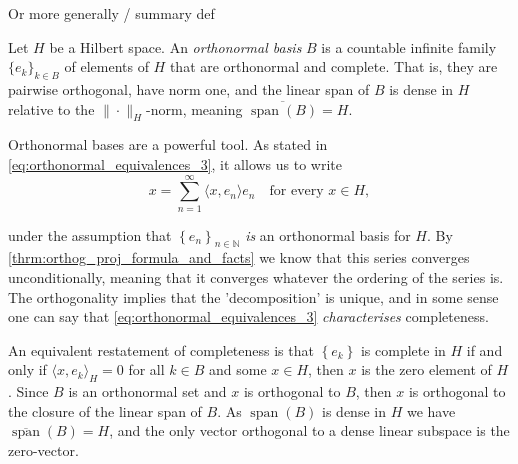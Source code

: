 \documentclass[../thesis.tex]{subfiles}
\begin{document}
Or more generally  / summary def

\begin{definition}
    Let $H$ be a Hilbert space. An \emph{orthonormal basis} $B$ is a countable infinite family $\{e_k\}_{k\in B}$ of elements of $H$ that are orthonormal and complete. That is, they are pairwise orthogonal, have norm one, and the linear span of $B$ is dense in $H$ relative to the $\|\cdot\|_H$-norm, meaning $\overline{\operatorname{span}(B)} = H$. 
\end{definition}


Orthonormal bases are a powerful tool. As stated in \cref{eq:orthonormal_equivalences_3}, it allows us to write
\begin{equation*}
    x= \sum_{n=1}^{\infty} \langle x, e_n \rangle e_n \quad \text{for every } x\in H,
\end{equation*}

under the assumption that $\left\{ e_{n} \right\}_{n\in \mathbb{N}}$ \emph{is} an orthonormal basis for $H$.  By \cref{thrm:orthog_proj_formula_and_facts} we know that this series converges unconditionally, meaning that it converges whatever the ordering of the series is. The orthogonality implies that the 'decomposition' is unique, and in some sense one can say that \cref{eq:orthonormal_equivalences_3} \emph{characterises} completeness. %

An equivalent restatement of completeness is that $\left\{ e_k \right\}$ is complete in $H$ if and only if $\langle x, e_k \rangle_{H} = 0$ for all $k\in B$ and some $x\in H$, then $x$ is the zero element of $H$. Since $B$ is an orthonormal set and $x$ is orthogonal to $B$, then $x$ is orthogonal to the closure of the linear span of $B$. As $\operatorname{span}(B)$ is dense in $H$ we have $\overline{\operatorname{span}}(B) = H$, and the only vector orthogonal to a dense linear subspace is the zero-vector. 


\end{document}
